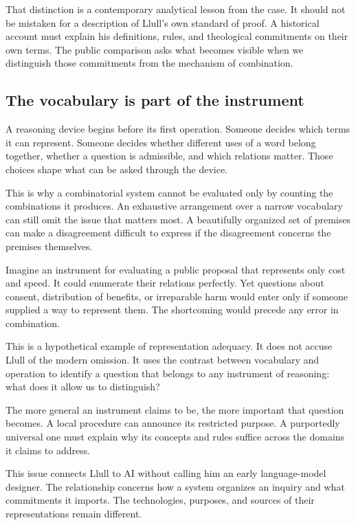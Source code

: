 \documentclass[11pt]{article}
\begin{document}
That distinction is a contemporary analytical lesson from the case. It should
not be mistaken for a description of Llull's own standard of proof. A historical
account must explain his definitions, rules, and theological commitments on
their own terms. The public comparison asks what becomes visible when we
distinguish those commitments from the mechanism of combination.

\subsection{The vocabulary is part of the instrument}

A reasoning device begins before its first operation. Someone decides which
terms it can represent. Someone decides whether different uses of a word
belong together, whether a question is admissible, and which relations matter.
Those choices shape what can be asked through the device.

This is why a combinatorial system cannot be evaluated only by counting the
combinations it produces. An exhaustive arrangement over a narrow vocabulary
can still omit the issue that matters most. A beautifully organized set of
premises can make a disagreement difficult to express if the disagreement
concerns the premises themselves.

Imagine an instrument for evaluating a public proposal that represents only
cost and speed. It could enumerate their relations perfectly. Yet questions
about consent, distribution of benefits, or irreparable harm would enter only
if someone supplied a way to represent them. The shortcoming would precede
any error in combination.

This is a hypothetical example of representation adequacy. It does not accuse
Llull of the modern omission. It uses the contrast between vocabulary and
operation to identify a question that belongs to any instrument of reasoning:
what does it allow us to distinguish?

The more general an instrument claims to be, the more important that question
becomes. A local procedure can announce its restricted purpose. A purportedly
universal one must explain why its concepts and rules suffice across the
domains it claims to address.

This issue connects Llull to AI without calling him an early language-model
designer. The relationship concerns how a system organizes an inquiry and
what commitments it imports. The technologies, purposes, and sources of
their representations remain different.
\end{document}
